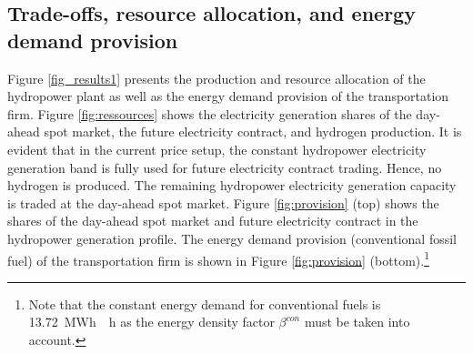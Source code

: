 \documentclass[review]{elsarticle}
\begin{document}
\subsection{Trade-offs, resource allocation, and energy demand provision}\label{res:1_tradeoffs}
Figure \ref{fig_results1} presents the production and resource allocation of the hydropower plant as well as the energy demand provision of the transportation firm. Figure \ref{fig:ressources} shows the electricity generation shares of the day-ahead spot market, the future electricity contract, and hydrogen production. It is evident that in the current price setup, the constant hydropower electricity generation band is fully used for future electricity contract trading. Hence, no hydrogen is produced. The remaining hydropower electricity generation capacity is traded at the day-ahead spot market. Figure \ref{fig:provision} (top) shows the shares of the day-ahead spot market and future electricity contract in the hydropower generation profile. The energy demand provision (conventional fossil fuel) of the transportation firm is shown in Figure \ref{fig:provision} (bottom).\footnote{Note that the constant energy demand for conventional fuels is \SI{13.72}{MWh \per \hour} as the energy density factor $\beta^{con}$ must be taken into account.}
\end{document}
